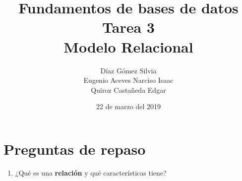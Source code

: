 \documentclass{article}
\begin{document}
    \title{
        Fundamentos de bases de datos \\
        Tarea 3 \\
        Modelo Relacional
    }
    \author{
        Díaz Gómez Silvia \\
        Eugenio Aceves Narciso Isaac \\
        Quiroz Castañeda Edgar
    }
    \date {
        22 de marzo del 2019    
    }
    \maketitle

    \section{Preguntas de repaso}
    \begin{enumerate}[label = \alph*.]
        \item ¿Qué es una \textbf{relación} y qué características tiene?
        

\end{enumerate}
\end{document}
